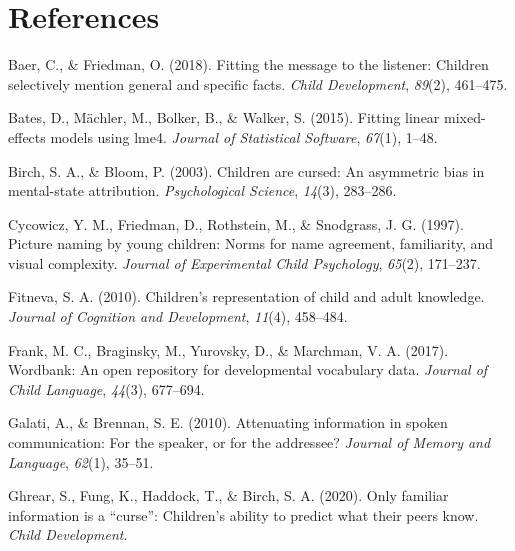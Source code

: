 \documentclass[10pt, letterpaper]{article}
\newenvironment{CSLReferences}%
  {}%
  {\par}
\begin{document}
\vspace{1em} 

\hypertarget{references}{%
\section{References}\label{references}}

\setlength{\parindent}{-0.1in} 
\setlength{\leftskip}{0.125in}

\noindent

\hypertarget{refs}{}
\begin{CSLReferences}{1}{0}
\leavevmode\hypertarget{ref-baer2018}{}%
Baer, C., \& Friedman, O. (2018). Fitting the message to the listener:
Children selectively mention general and specific facts. \emph{Child
Development}, \emph{89}(2), 461--475.

\leavevmode\hypertarget{ref-bates2015}{}%
Bates, D., Mächler, M., Bolker, B., \& Walker, S. (2015). Fitting linear
mixed-effects models using {lme4}. \emph{Journal of Statistical
Software}, \emph{67}(1), 1--48.

\leavevmode\hypertarget{ref-birch2003}{}%
Birch, S. A., \& Bloom, P. (2003). Children are cursed: An asymmetric
bias in mental-state attribution. \emph{Psychological Science},
\emph{14}(3), 283--286.

\leavevmode\hypertarget{ref-cycowicz1997}{}%
Cycowicz, Y. M., Friedman, D., Rothstein, M., \& Snodgrass, J. G.
(1997). Picture naming by young children: Norms for name agreement,
familiarity, and visual complexity. \emph{Journal of Experimental Child
Psychology}, \emph{65}(2), 171--237.

\leavevmode\hypertarget{ref-fitneva2010}{}%
Fitneva, S. A. (2010). Children's representation of child and adult
knowledge. \emph{Journal of Cognition and Development}, \emph{11}(4),
458--484.

\leavevmode\hypertarget{ref-frank2017}{}%
Frank, M. C., Braginsky, M., Yurovsky, D., \& Marchman, V. A. (2017).
Wordbank: An open repository for developmental vocabulary data.
\emph{Journal of Child Language}, \emph{44}(3), 677--694.

\leavevmode\hypertarget{ref-galati2010}{}%
Galati, A., \& Brennan, S. E. (2010). Attenuating information in spoken
communication: For the speaker, or for the addressee? \emph{Journal of
Memory and Language}, \emph{62}(1), 35--51.

\leavevmode\hypertarget{ref-ghrear2020}{}%
Ghrear, S., Fung, K., Haddock, T., \& Birch, S. A. (2020). Only familiar
information is a {``curse''}: Children's ability to predict what their
peers know. \emph{Child Development}.


\end{CSLReferences}
\end{document}
